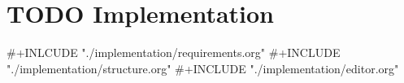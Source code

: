 \documentclass[11pt]{article}
\author{so}
\date{\today}
\title{}
\begin{document}
\tableofcontents

\section{{\bfseries\sffamily TODO} Implementation}
\label{sec:orgaf63f54}

\#+INLCUDE "./implementation/requirements.org"
\#+INCLUDE "./implementation/structure.org"
\#+INCLUDE "./implementation/editor.org"
\end{document}
